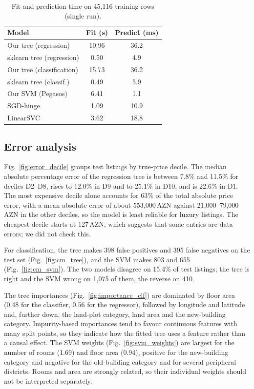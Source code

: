 \documentclass[10pt,twocolumn,a4paper]{article}
\begin{document}
\begin{table}[t]
  \centering
  \footnotesize
  \caption{Fit and prediction time on 45{,}116 training rows (single run).}
  \label{tab:timing}
  \begin{tabular}{@{}lcc@{}}
    \toprule
    Model & Fit (s) & Predict (ms) \\
    \midrule
    Our tree (regression)      & 10.96 & 36.2 \\
    sklearn tree (regression)  & 0.50 & 4.9 \\
    Our tree (classification)  & 15.73 & 36.2 \\
    sklearn tree (classif.)    & 0.49 & 5.9 \\
    Our SVM (Pegasos)          & 6.41 & 1.1 \\
    SGD-hinge                  & 1.09 & 10.9 \\
    LinearSVC                  & 3.62 & 18.8 \\
    \bottomrule
  \end{tabular}
\end{table}

\subsection{Error analysis}
Fig.~\ref{fig:error_decile} groups test listings by true-price decile. The
median absolute percentage error of the regression tree is between 7.8\% and
11.5\% for deciles D2--D8, rises to 12.0\% in D9 and to 25.1\% in D10, and is
22.6\% in D1. The most expensive decile alone accounts for 63\% of the total
absolute price error, with a mean absolute error of about 553{,}000\,AZN
against 21{,}000--79{,}000\,AZN in the other deciles, so the model is least
reliable for luxury listings. The cheapest decile starts at 127\,AZN, which
suggests that some entries are data errors; we did not check this.

For classification, the tree makes 398 false positives and 395 false negatives
on the test set (Fig.~\ref{fig:cm_tree}), and the SVM makes 803 and 655
(Fig.~\ref{fig:cm_svm}). The two models disagree on 15.4\% of test listings;
the tree is right and the SVM wrong on 1{,}075 of them, the reverse on 410.

The tree importances (Fig.~\ref{fig:importance_clf}) are dominated by floor
area (0.48 for the classifier, 0.56 for the regressor), followed by longitude
and latitude and, further down, the land-plot category, land area and the
new-building category. Impurity-based
importances tend to favour continuous features with many split points, so they
indicate how the fitted tree uses a feature rather than a causal effect. The
SVM weights (Fig.~\ref{fig:svm_weights}) are largest for the number of rooms
(1.69) and floor area (0.94), positive for the new-building category and
negative for the old-building category and for several peripheral districts.
Rooms and area are strongly related, so their individual weights should not be
interpreted separately.
\end{document}
